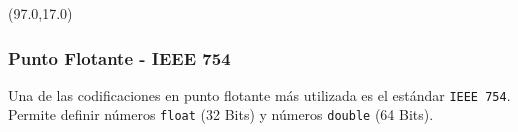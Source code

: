 \documentclass[aspectratio=169]{beamer}
\begin{document}
\begin{frame}[fragile,t]
    \begin{textblock}{60}(97.0,17.0)
    \end{textblock}
    
\end{frame}

\begin{frame}[fragile]
    \frametitle{Punto Flotante - IEEE 754}
    Una de las codificaciones en punto flotante más utilizada es el estándar \texttt{IEEE 754}.\\
    Permite definir números \textcolor{verdeuca}{\texttt{float}} (32 Bits) y números \textcolor{verdeuca}{\texttt{double}} (64 Bits).\\
    \bigskip

\end{frame}
\end{document}
